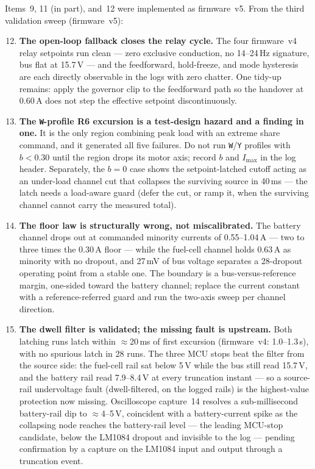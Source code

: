 \documentclass[11pt]{article}
\newcommand{\code}[1]{\texttt{#1}}
\begin{document}
Items~9, 11 (in part), and~12 were implemented as firmware~v5. From the third
validation sweep (firmware~v5):

\begin{enumerate}
\setcounter{enumi}{11}
\item \textbf{The open-loop fallback closes the relay cycle.} The four
firmware~v4 relay setpoints run clean --- zero exclusive conduction, no
14--24\,Hz signature, bus flat at 15.7\,V --- and the feedforward, hold-freeze,
and mode hysteresis are each directly observable in the logs with zero chatter.
One tidy-up remains: apply the governor clip to the feedforward path so the
handover at 0.60\,A does not step the effective setpoint discontinuously.
\item \textbf{The \code{W}-profile R6 excursion is a test-design hazard and a
finding in one.} It is the only region combining peak load with an extreme
share command, and it generated all five failures. Do not run \code{W}/\code{Y}
profiles with $b < 0.30$ until the region drops its motor axis; record $b$ and
$I_\mathrm{max}$ in the log header. Separately, the $b=0$ case shows the
setpoint-latched cutoff acting as an under-load channel cut that collapses the
surviving source in 40\,ms --- the latch needs a load-aware guard (defer the cut,
or ramp it, when the surviving channel cannot carry the measured total).
\item \textbf{The floor law is structurally wrong, not miscalibrated.} The
battery channel drops out at commanded minority currents of 0.55--1.04\,A ---
two to three times the 0.30\,A floor --- while the fuel-cell channel holds
0.63\,A as minority with no dropout, and 27\,mV of bus voltage separates a
28-dropout operating point from a stable one. The boundary is a
bus-versus-reference margin, one-sided toward the battery channel; replace the
current constant with a reference-referred guard and run the two-axis sweep per
channel direction.
\item \textbf{The dwell filter is validated; the missing fault is upstream.}
Both latching runs latch within $\approx$20\,ms of first excursion (firmware~v4:
1.0--1.3\,s), with no spurious latch in 28 runs. The three MCU stops beat the
filter from the source side: the fuel-cell rail sat below 5\,V while the bus
still read 15.7\,V, and the battery rail read 7.9--8.4\,V at every truncation
instant --- so a source-rail undervoltage fault (dwell-filtered, on the logged
rails) is the highest-value protection now missing. Oscilloscope capture~14
resolves a sub-millisecond battery-rail dip to $\approx$4--5\,V, coincident
with a battery-current spike as the collapsing node reaches the battery-rail
level --- the leading MCU-stop candidate, below the LM1084 dropout and
invisible to the log --- pending confirmation by a capture on the LM1084
input and output through a truncation event.
\end{enumerate}
\end{document}
